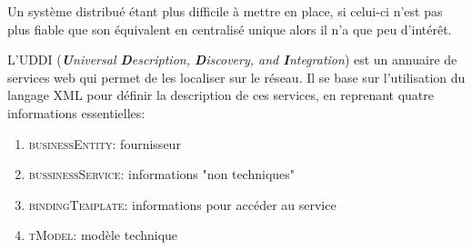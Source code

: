 \item{}
{\vrai}
{Un système distribué étant plus difficile à mettre en place, si celui-ci n'est pas plus fiable que son équivalent en centralisé unique alors il n'a que peu d'intérêt.


}

\item{}
{}
{}

\item{}
{}
{}

\item{}
{\faux}
{L'UDDI (\textit{\textbf{U}niversal \textbf{D}escription, \textbf{D}iscovery, and \textbf{I}ntegration}) est un annuaire de services web qui permet de les localiser sur le réseau. Il se base sur l'utilisation du langage XML pour définir la description de ces services, en reprenant quatre informations essentielles:
\begin{enumerate}
\item\textcolor{ltred}{\textsc{businessEntity}}: fournisseur
\item\textcolor{ltred}{\textsc{bussinessService}}: informations "non techniques"
\item\textcolor{ltred}{\textsc{bindingTemplate}}: informations pour accéder au service
\item\textcolor{ltred}{\textsc{tModel}}: modèle technique
\end{enumerate}
 }

